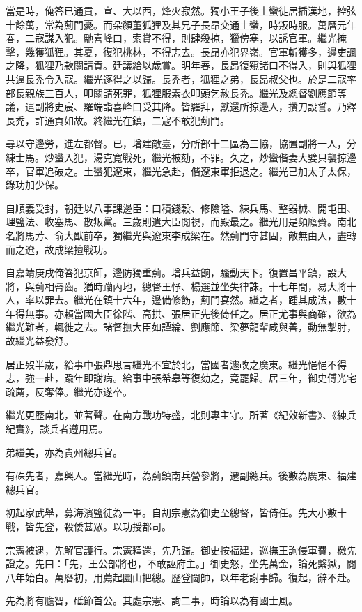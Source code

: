 \begin{pinyinscope}
當是時，俺答已通貢，宣、大以西，烽火寂然。獨小王子後土蠻徙居插漢地，控弦十餘萬，常為薊門憂。而朵顏董狐狸及其兄子長昂交通土蠻，時叛時服。萬曆元年春，二寇謀入犯。馳喜峰口，索賞不得，則肆殺掠，獵傍塞，以誘官軍。繼光掩擊，幾獲狐狸。其夏，復犯桃林，不得志去。長昂亦犯界嶺。官軍斬獲多，邊吏諷之降，狐狸乃款關請貢。廷議給以歲賞。明年春，長昂復窺諸口不得入，則與狐狸共逼長禿令入寇。繼光逐得之以歸。長禿者，狐狸之弟，長昂叔父也。於是二寇率部長親族三百人，叩關請死罪，狐狸服素衣叩頭乞赦長禿。繼光及總督劉應節等議，遣副將史宸、羅端詣喜峰口受其降。皆羅拜，獻還所掠邊人，攢刀設誓。乃釋長禿，許通貢如故。終繼光在鎮，二寇不敢犯薊門。

尋以守邊勞，進左都督。已，增建敵臺，分所部十二區為三協，協置副將一人，分練士馬。炒蠻入犯，湯克寬戰死，繼光被劾，不罪。久之，炒蠻偕妻大嬖只襲掠邊卒，官軍追破之。土蠻犯遼東，繼光急赴，偕遼東軍拒退之。繼光已加太子太保，錄功加少保。

自順義受封，朝廷以八事課邊臣：曰積錢穀、修險隘、練兵馬、整器械、開屯田、理鹽法、收塞馬、散叛黨。三歲則遣大臣閱視，而殿最之。繼光用是頻廕賚。南北名將馬芳、俞大猷前卒，獨繼光與遼東李成梁在。然薊門守甚固，敵無由入，盡轉而之遼，故成梁擅戰功。

自嘉靖庚戌俺答犯京師，邊防獨重薊。增兵益餉，騷動天下。復置昌平鎮，設大將，與薊相脣齒。猶時躪內地，總督王忬、楊選並坐失律誅。十七年間，易大將十人，率以罪去。繼光在鎮十六年，邊備修飭，薊門宴然。繼之者，踵其成法，數十年得無事。亦賴當國大臣徐階、高拱、張居正先後倚任之。居正尤事與商確，欲為繼光難者，輒徙之去。諸督撫大臣如譚綸、劉應節、梁夢龍輩咸與善，動無掣肘，故繼光益發舒。

居正歿半歲，給事中張鼎思言繼光不宜於北，當國者遽改之廣東。繼光悒悒不得志，強一赴，踰年即謝病。給事中張希皋等復劾之，竟罷歸。居三年，御史傅光宅疏薦，反奪俸。繼光亦遂卒。

繼光更歷南北，並著聲。在南方戰功特盛，北則專主守。所著《紀效新書》、《練兵紀實》，談兵者遵用焉。

弟繼美，亦為貴州總兵官。

有硃先者，嘉興人。當繼光時，為薊鎮南兵營參將，遷副總兵。後數為廣東、福建總兵官。

初起家武舉，募海濱鹽徒為一軍。自胡宗憲為御史至總督，皆倚任。先大小數十戰，皆先登，殺倭甚眾。以功授都司。

宗憲被逮，先解官護行。宗憲釋還，先乃歸。御史按福建，巡撫王詢侵軍費，檄先證之。先曰：「先，王公部將也，不敢誣府主。」御史怒，坐先萬金，論死繫獄，閱八年始白。萬曆初，用薦起圜山把總。歷登閫帥，以年老謝事歸。復起，辭不赴。

先為將有膽智，砥節首公。其處宗憲、詢二事，時論以為有國士風。


\end{pinyinscope}
